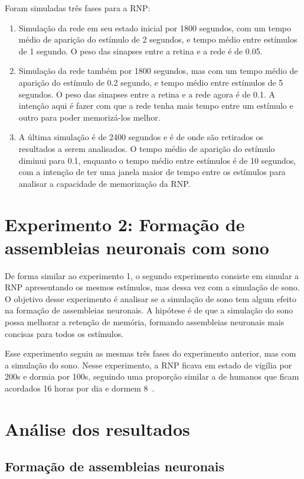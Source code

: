 Foram simuladas três fases para a RNP:\@

\begin{enumerate}
  \item Simulação da rede em seu estado inicial por 1800 segundos, com um tempo médio de aparição do estímulo de 2 segundos, e
  tempo médio entre estímulos de 1 segundo. O peso das sinapses entre a retina e a rede é de 0.05.
  \item Simulação da rede também por 1800 segundos, mas com um tempo médio de aparição do estímulo de 0.2 segundo, e
  tempo médio entre estímulos de 5 segundos. O peso das sinapses entre a retina e a rede agora é de 0.1. A intenção aqui é
  fazer com que a rede tenha mais tempo entre um estímulo e outro para poder memorizá-los melhor.
  \item A última simulação é de 2400 segundos e é de onde são retirados os resultados a serem analisados. O tempo médio de aparição do estímulo diminui
  para 0.1, enquanto o tempo médio entre estímulos é de 10 segundos, com a intenção de ter uma janela maior de tempo entre os
  estímulos para analisar a capacidade de memorização da RNP.\@
\end{enumerate}


\section{Experimento 2: Formação de assembleias neuronais com sono}

De forma similar ao experimento 1, o segundo experimento consiste em simular a RNP apresentando os mesmos estímulos, mas dessa vez
com a simulação de sono. O objetivo desse experimento é analisar se a simulação de sono tem algum efeito na formação de
assembleias neuronais. A hipótese é de que a simulação do sono possa melhorar a retenção de memória, formando assembleias
neuronais mais concisas para todos os estímulos.

Esse experimento seguiu as mesmas três fases do experimento anterior, mas com a simulação do sono. Nesse experimento, a RNP ficava
em estado de vigília por 200s e dormia por 100s, seguindo uma proporção similar a de humanos que ficam acordados 16 horas por dia
e dormem 8~\cite{waterhouseDaily2012}.

\section{Análise dos resultados}

\subsection{Formação de assembleias neuronais}

